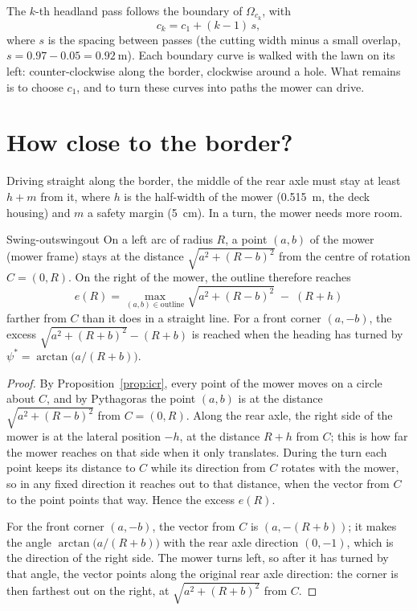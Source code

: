 The $k$-th headland pass follows the boundary of $\Omega_{c_k}$, with
\[
  c_k = c_1 + (k - 1)\,s,
\]
where $s$ is the spacing between passes (the cutting width minus a small
overlap, $s = 0.97 - 0.05 = \SI{0.92}{\metre}$). Each boundary curve is
walked with the lawn on its left: counter-clockwise along the border,
clockwise around a hole. What remains is to choose $c_1$, and to turn these
curves into paths the mower can drive.

\section{How close to the border?}

Driving straight along the border, the middle of the rear axle must stay at
least $h + m$ from it, where $h$ is the half-width of the mower
(\SI{0.515}{\metre}, the deck housing) and $m$ a safety margin
(\SI{5}{\centi\metre}). In a turn, the mower needs more room.

\begin{proposition}{Swing-out}{swingout}
  On a left arc of radius $R$, a point $(a, b)$ of the mower (mower frame)
  stays at the distance $\sqrt{a^2 + (R - b)^2}$ from the centre of rotation
  $C = (0, R)$. On the right of the mower, the outline therefore reaches
  \[
    e(R) = \max_{(a, b) \in \text{outline}} \sqrt{a^2 + (R - b)^2}
      \;-\; (R + h)
  \]
  farther from $C$ than it does in a straight line. For a front corner
  $(a, -b)$, the excess $\sqrt{a^2 + (R + b)^2} - (R + b)$ is reached when
  the heading has turned by $\psi^* = \arctan\bigl(a / (R + b)\bigr)$.
\end{proposition}

\begin{proof}
  By Proposition~\ref{prop:icr}, every point of the mower moves on a circle
  about $C$, and by Pythagoras the point $(a, b)$ is at the distance
  $\sqrt{a^2 + (R - b)^2}$ from $C = (0, R)$. Along the rear axle, the right
  side of the mower is at the lateral position $-h$, at the distance $R + h$
  from $C$; this is how far the mower reaches on that side when it only
  translates. During the turn each point keeps its distance to $C$ while
  its direction from $C$ rotates with the mower, so in any fixed direction
  it reaches out to that distance, when the vector from $C$ to the point
  points that way. Hence the excess $e(R)$.

  For the front corner $(a, -b)$, the vector from $C$ is $(a, -(R + b))$; it
  makes the angle $\arctan\bigl(a/(R + b)\bigr)$ with the rear axle
  direction $(0, -1)$, which is the direction of the right side. The mower
  turns left, so after it has turned by that angle, the vector points along
  the original rear axle direction: the corner is then farthest out on the
  right, at $\sqrt{a^2 + (R + b)^2}$ from $C$.
\end{proof}

